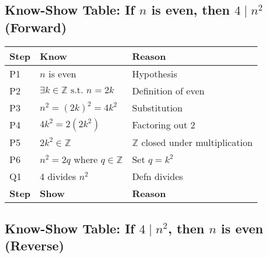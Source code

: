 \documentclass[12pt]{article}
\theoremstyle{definition}
\begin{document}

\subsection[]{Know-Show Table: If \( n \) is even, then \( 4 \mid n^2 \) (Forward)}

\begin{center}
    \begin{tabular}{|p{}|p{}|p{}|}
    \hline
    \textbf{Step} & \textbf{Know} & \textbf{Reason} \\
    \hline
        P1 & \( n \) is even & Hypothesis \\
    \hline
        P2 & \( \exists k \in \mathbb{Z} \text{ s.t. } n = 2k \) & Definition of even \\
    \hline
        P3 & \( n^2 = (2k)^2 = 4k^2 \) & Substitution \\
    \hline
        P4 & \( 4k^2 = 2(2k^2) \) & Factoring out \( 2 \) \\
    \hline
        P5 & \( 2k^2 \in \mathbb{Z} \) & \( \mathbb{Z}\) closed under multiplication \\
    \hline
        P6 & \( n^2 = 2q \) where \( q \in \mathbb{Z} \) & Set \( q = k^2 \) \\
    \hline
        Q1 & 4 divides \( n^2 \) & Defn divides \\
    \hline
    \textbf{Step} & \textbf{Show} & \textbf{Reason} \\
    \hline
    \end{tabular}
\end{center}


\subsection[]{Know-Show Table: If \( 4 \mid n^2 \), then \( n \) is even (Reverse)}
\end{document}
